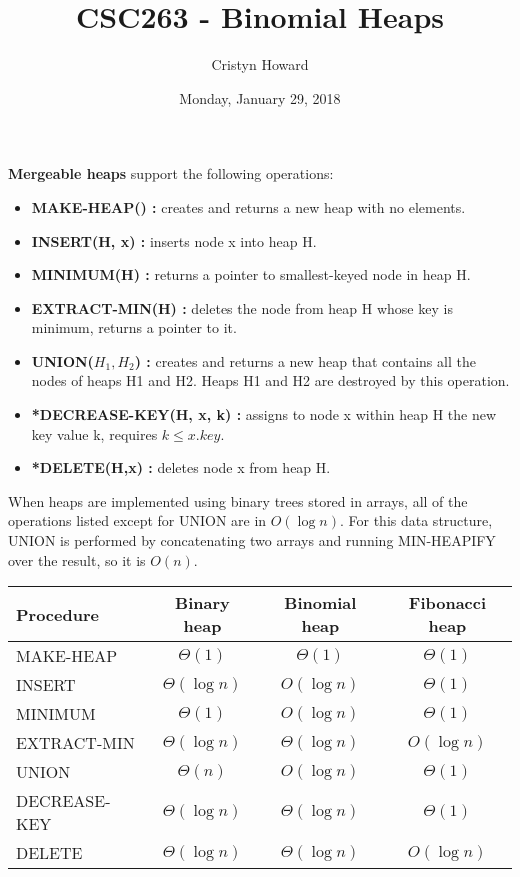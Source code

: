 \documentclass[12pt]{article}
\title{CSC263 - Binomial Heaps}
\author{Cristyn Howard}
\date{Monday, January 29, 2018}
\begin{document}
\maketitle

\textbf{Mergeable heaps} support the following operations:
	\begin{itemize}
	\item \textbf{MAKE-HEAP() : }creates and returns a new heap with no elements. 
	\item \textbf{INSERT(H, x) : }inserts node x into heap H.
	\item \textbf{MINIMUM(H) : }returns a pointer to smallest-keyed node in heap H.
	\item \textbf{EXTRACT-MIN(H) : }deletes the node from heap H whose key is minimum, returns a pointer to it.
	\item \textbf{UNION($H_1, H_2$) : }creates and returns a new heap that contains all the nodes of heaps H1 and H2. Heaps H1 and H2 are destroyed by this operation.
	\item \textbf{*DECREASE-KEY(H, x, k) : }assigns to node x within heap H the new key value k, requires $k \leq x.key$.
	\item \textbf{*DELETE(H,x) : }deletes node x from heap H.
	\end{itemize}

When heaps are implemented using binary trees stored in arrays, all of the operations listed except for UNION are in $O(\log{n})$. For this data structure, UNION is performed by concatenating two arrays and running MIN-HEAPIFY over the result, so it is $O(n)$.
\vspace{0.5cm}

\begin{center}
\begin{tabular}{|l|c|c|c|}
\hline
\textbf{Procedure} &	 \textbf{Binary heap} &  \textbf{Binomial heap} & \textbf{Fibonacci heap} \\
\hline
MAKE-HEAP & $\Theta(1)$ & 		$\Theta(1)$ & $\Theta(1)$ \\
\hline
INSERT  & 	$\Theta(\log{n})$ & 	$O(\log{n})$ & $\Theta(1)$ \\
\hline
MINIMUM  & 	$\Theta(1)$ & 		$O(\log{n})$ & $\Theta(1)$ \\
\hline
EXTRACT-MIN  & $\Theta(\log{n})$ & $\Theta(\log{n})$ & $O(\log{n})$ \\
\hline
UNION  & 	$\Theta(n)$ & 		$O(\log{n})$ & $\Theta(1)$ \\
\hline
DECREASE-KEY  & $\Theta(\log{n})$ & $\Theta(\log{n})$ & $\Theta(1)$ \\
\hline
DELETE  & 	$\Theta(\log{n})$ & $\Theta(\log{n})$ &$O(\log{n})$ \\
\hline
\end{tabular}
\end{center}
\vspace{0.5cm}
\end{document}
